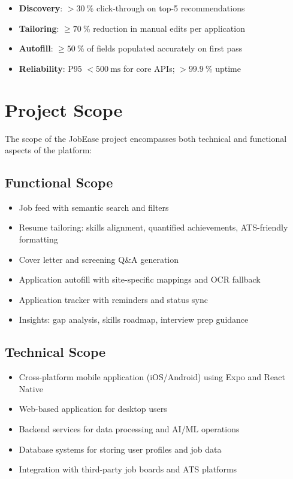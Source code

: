 \documentclass[12pt,a4paper]{report}
\begin{document}
\begin{itemize}[leftmargin=2em]
  \item \textbf{Discovery}: $>\SI{30}{\percent}$ click-through on top-5 recommendations
  \item \textbf{Tailoring}: $\geq \SI{70}{\percent}$ reduction in manual edits per application
  \item \textbf{Autofill}: $\geq \SI{50}{\percent}$ of fields populated accurately on first pass
  \item \textbf{Reliability}: P95 $< \SI{500}{\milli\second}$ for core APIs; $>\SI{99.9}{\percent}$ uptime
\end{itemize}

\section{Project Scope}
The scope of the JobEase project encompasses both technical and functional aspects of the platform:

\subsection{Functional Scope}
\begin{itemize}[leftmargin=2em]
  \item Job feed with semantic search and filters
  \item Resume tailoring: skills alignment, quantified achievements, ATS-friendly formatting
  \item Cover letter and screening Q\&A generation
  \item Application autofill with site-specific mappings and OCR fallback
  \item Application tracker with reminders and status sync
  \item Insights: gap analysis, skills roadmap, interview prep guidance
\end{itemize}

\subsection{Technical Scope}
\begin{itemize}[leftmargin=2em]
  \item Cross-platform mobile application (iOS/Android) using Expo and React Native
  \item Web-based application for desktop users
  \item Backend services for data processing and AI/ML operations
  \item Database systems for storing user profiles and job data
  \item Integration with third-party job boards and ATS platforms
\end{itemize}
\end{document}
